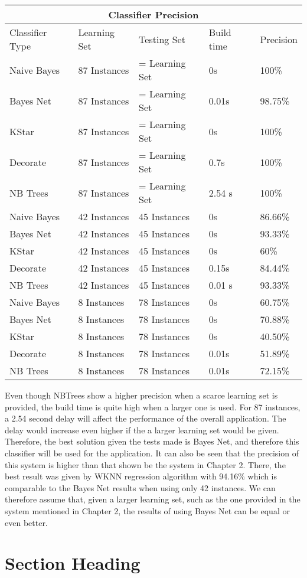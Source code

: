 \begin{tabular}{ |p{3cm}|p{3cm}|p{3cm}|p{2cm}|p{2cm}| }
 \hline
 \multicolumn{5}{|c|}{Classifier Precision} \\
 \hline
 Classifier Type & Learning Set & Testing Set & Build time & Precision\\
 \hline
 Naive Bayes & 87 Instances & = Learning Set & 0s & 100\% \\
 Bayes Net   & 87 Instances & = Learning Set & 0.01s & 98.75\% \\
 KStar       & 87 Instances & = Learning Set & 0s & 100\% \\
 Decorate    & 87 Instances & = Learning Set & 0.7s & 100\% \\
 NB Trees    & 87 Instances & = Learning Set & 2.54 s & 100\% \\
 Naive Bayes & 42 Instances & 45 Instances & 0s & 86.66\% \\
 Bayes Net   & 42 Instances & 45 Instances & 0s & 93.33\% \\
 KStar       & 42 Instances & 45 Instances & 0s & 60\% \\
 Decorate    & 42 Instances & 45 Instances & 0.15s & 84.44\% \\
 NB Trees    & 42 Instances & 45 Instances & 0.01 s & 93.33\% \\
 Naive Bayes & 8 Instances & 78 Instances & 0s & 60.75\% \\
 Bayes Net   & 8 Instances & 78 Instances & 0s & 70.88\% \\
 KStar       & 8 Instances & 78 Instances & 0s & 40.50\% \\
 Decorate    & 8 Instances & 78 Instances & 0.01s & 51.89\% \\
 NB Trees    & 8 Instances & 78 Instances & 0.01s & 72.15\% \\
 \hline
\end{tabular}

\medskip \noindent Even though NBTrees show a higher precision when a scarce learning set is provided, the build time is quite high when a larger one is used. For 87 instances, a 2.54 second delay will affect the performance of the overall application. The delay would increase even higher if the a larger learning set would be given. Therefore, the best solution given the tests made is Bayes Net, and therefore this classifier will be used for the application.
It can also be seen that the precision of this system is higher than that shown be the system in Chapter 2. There, the best result was given by WKNN regression algorithm with 94.16\% which is comparable to the Bayes Net results when using only 42 instances. We can therefore assume that, given a larger learning set, such as the one provided in the system mentioned in Chapter 2, the results of using Bayes Net can be equal or even better.



\section{Section Heading}
